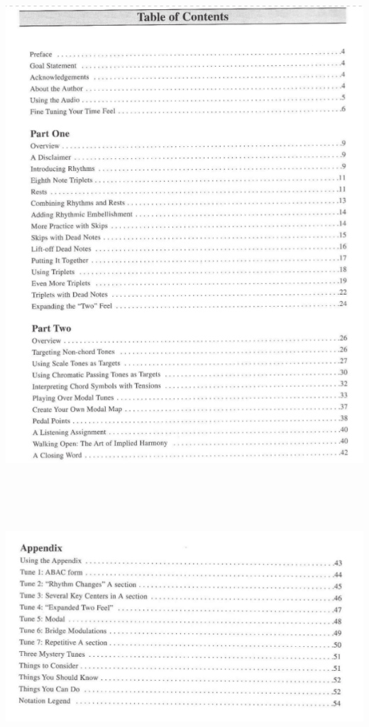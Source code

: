\documentclass[a4paper]{book}
\begin{document}
\begin{center}
\includegraphics[width=15.714cm,height=20.052cm]{lebluessupportsmethodes-img159.png}
\end{center}


\begin{center}
\includegraphics[width=15.395cm,height=8.174cm]{lebluessupportsmethodes-img160.png}
\end{center}
\end{document}
